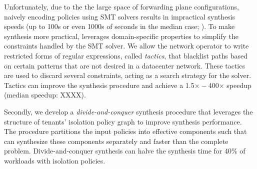 
Unfortunately, due to the the large space of forwarding plane
configurations, naively encoding policies using SMT solvers results in
impractical synthesis speeds (up to 100s or even 1000s of seconds in
the median case; ).
To make synthesis more practical, \Name leverages domain-specific
properties to simplify the constraints handled by the SMT solver.
We allow the network operator to write restricted
forms of regular expressions, called \emph{tactics}, that blacklist
paths based on certain patterns that are not desired in a datacenter
network.
These tactics are used to discard several constraints, 
acting as a search strategy for the solver.
Tactics can improve the synthesis procedure and achieve
a 1.5$\times - $400$\times$ speedup (median speedup:
XXXX).

 Secondly, we develop a \emph{divide-and-conquer} synthesis procedure
 that leverages the structure of tenants' isolation policy graph to
 improve synthesis performance. The procedure partitions the input
 policies into effective components such that \name can synthesize
 these components separately and faster than the complete problem.
 Divide-and-conquer synthesis can halve the synthesis time for 40\% of
 workloads with isolation policies.


